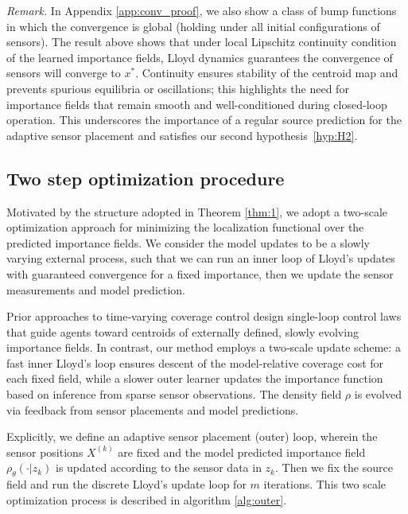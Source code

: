 \documentclass[onefignum,onetabnum]{siamart171218} %
\def\hyph{-\penalty0\hskip0pt\relax}
\begin{document}
\emph{Remark.}
In Appendix \ref{app:conv_proof}, we also show a class of bump functions in which the convergence is global (holding under all initial configurations of sensors).  The  result above shows that under local Lipschitz continuity condition of the learned importance fields, Lloyd dynamics guarantees the convergence of sensors will converge to $x^*$. 
Continuity ensures stability of the centroid map and prevents spurious equilibria or oscillations; this highlights the need for importance fields that remain smooth and well-conditioned during closed-loop operation. This underscores the importance of a regular source prediction for the adaptive sensor placement and satisfies our second hypothesis~\ref{hyp:H2}.


\subsection{Two step optimization procedure}
\label{sec:methodology_two_step}

Motivated by the structure adopted in Theorem \ref{thm:1}, we adopt a two-scale optimization approach for minimizing the localization functional over the predicted importance fields. We consider the model updates to be a slowly varying external process, such that we can run an inner loop of Lloyd's updates with guaranteed convergence for a fixed importance, then we update the sensor measurements and model prediction.

Prior approaches to time‑varying coverage control \cite{lee2013controlled, lee2015multirobot, kennedy2019generalized, santos2019decentralized} design single\hyph loop control laws that guide agents toward centroids of externally defined, slowly evolving importance fields.
In contrast, our method employs a two‑scale update scheme: a fast inner Lloyd’s loop ensures descent of the model‑relative coverage cost for each fixed field, while a slower outer learner updates the importance function based on inference from sparse sensor observations. The density field $\rho$ is evolved via feedback from sensor placements and model predictions.

Explicitly, we define an adaptive sensor placement (outer) loop, wherein the sensor positions $X^{(k)}$ are fixed and the model predicted importance field $\rho_\theta(\cdot|z_k)$ is updated according to the sensor data in $z_k$. Then we fix the source field and run the discrete Lloyd's update loop for $m$ iterations.
This two scale optimization process is described in algorithm \ref{alg:outer}.
\end{document}
